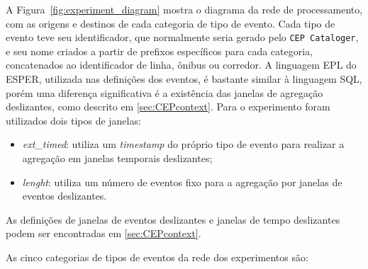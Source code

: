 A Figura~\autoref{fig:experiment_diagram} mostra o diagrama da rede de processamento, com as origens e destinos de cada categoria de tipo de evento. %
Cada tipo de evento teve seu identificador, que normalmente seria gerado pelo \texttt{CEP Cataloger}, e seu nome criados a partir de prefixos específicos para cada categoria, concatenados ao identificador de linha, ônibus ou corredor. A linguagem EPL do ESPER, utilizada nas definições dos eventos, é bastante similar à linguagem SQL, porém uma diferença significativa é a existência das janelas de agregação deslizantes, como descrito em \autoref{sec:CEPcontext}. Para o experimento foram utilizados dois tipos de janelas:


\begin{itemize}
    \item \textit{ext\_timed}: utiliza um \textit{timestamp} do próprio tipo de evento para realizar a agregação em janelas temporais deslizantes;
    \item \textit{lenght}: utiliza um número de eventos fixo para a agregação por janelas de eventos deslizantes.
\end{itemize}
As definições de janelas de eventos deslizantes e janelas de tempo deslizantes podem ser encontradas em  \autoref{sec:CEPcontext}. 

As cinco categorias de tipos de eventos da rede dos experimentos são: 

